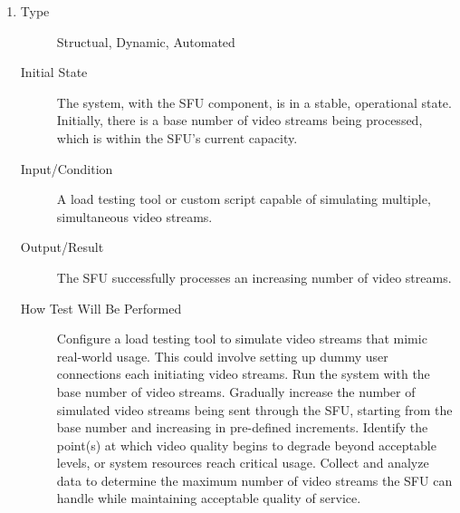 \documentclass[12pt, titlepage]{article}
\begin{document}
\begin{enumerate}[NFR-T1]
\item \label{NFRT6}
  \begin{description}
  \item[Type] Structual, Dynamic, Automated
  \item[Initial State] The system, with the SFU component, is in a stable,
    operational state. Initially, there is a base number of video streams being
    processed, which is within the SFU's current capacity.
  \item[Input/Condition] A load testing tool or custom script capable of simulating
    multiple, simultaneous video streams.
  \item[Output/Result] The SFU successfully processes an increasing number of video
    streams.
  \item[How Test Will Be Performed] Configure a load testing tool to simulate video
    streams that mimic real-world usage. This could involve setting up dummy
    user connections each initiating video streams. Run the system with the base
    number of video streams. Gradually increase the number of simulated video
    streams being sent through the SFU, starting from the base number and
    increasing in pre-defined increments. Identify the point(s) at which video
    quality begins to degrade beyond acceptable levels, or system resources
    reach critical usage. Collect and analyze data to determine the maximum
    number of video streams the SFU can handle while maintaining acceptable
    quality of service.

\end{description}
\end{enumerate}
\end{document}
